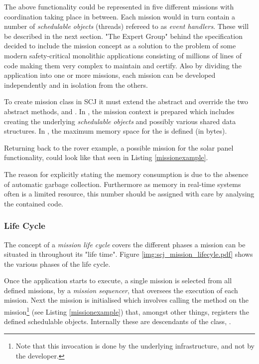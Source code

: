 The above functionality could be represented in five different missions with coordination taking place in between. Each mission would in turn contain a number of \textit{schedulable objects} (threads) refereed to as \textit{event handlers}. These will be described in the next section. "The Expert Group" behind the specification decided to include the mission concept as a solution to the problem of some modern safety-critical monolithic applications consisting of millions of lines of code making them very complex to maintain and certify. Also by dividing the application into one or more missions, each mission can be developed independently and in isolation from the others.  

To create mission class in SCJ it must extend the abstract  and override the two abstract methods,  and . In , the mission context is prepared which includes creating the underlying \textit{schedulable objects} and possibly various shared data structures. In , the maximum memory space for the  is defined (in bytes).

Returning back to the rover example, a possible mission for the solar panel functionality, could look like that seen in Listing \ref{missionexample}.



The reason for explicitly stating the memory consumption is due to the absence of automatic garbage collection. Furthermore as memory in real-time systems often is a limited resource, this number should be assigned with care by analysing the contained code.

\subsubsection{Life Cycle}
\label{subsec:lifecycle}
The concept of a \textit{mission life cycle} covers the different phases a mission can be situated in throughout its "life time". Figure \ref{img:scj_mission_lifecyle.pdf} shows the various phases of the life cycle.


Once the application starts to execute, a single mission is selected from all defined missions, by a \textit{mission sequencer}, that oversees the execution of each mission. Next the mission is initialised which involves calling the  method on the mission\footnote{Note that this invocation is done by the underlying infrastructure, and not by the developer.} (see Listing \ref{missionexample}) that, amongst other things, registers the defined schedulable objects. Internally these are descendants of the class, . 


